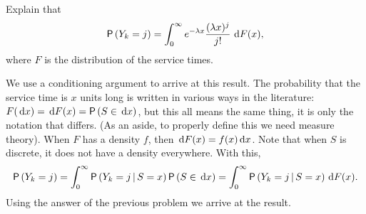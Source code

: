 \begin{exercise}[\faFlask]
 Explain that 
\begin{equation}\label{eq:10}
  \P{Y_k = j} = \int_0^\infty e^{-\lambda x}\frac{(\lambda x)^j}{j!}\, \d F(x),
\end{equation}
where $F$ is the distribution of the service times.
\begin{solution}
  We use a conditioning argument to arrive at this result. The
  probability that the service time is $x$ units long is written in
  various ways in the literature: $F(\d x) = \d F(x) = \P{S\in \d x}$,
  but this all means the same thing, it is only the notation that
  differs.  (As an aside, to properly define this we need measure
  theory). When $F$ has a density $f$, then
  $\,\text{d}F(x) = f(x) \,\text{d}x$.  Note that when $S$ is discrete, it does not
  have a density everywhere. With this,
    \begin{equation*}
    \P{Y_k=j} = \int_0^\infty \P{Y_k =j\given S=x}\P{S\in \d x} =
    \int_0^\infty \P{Y_k =j\given S=x} \d F(x).
    \end{equation*}
    Using the answer of the previous problem we arrive at the result.
\end{solution}
\end{exercise}


